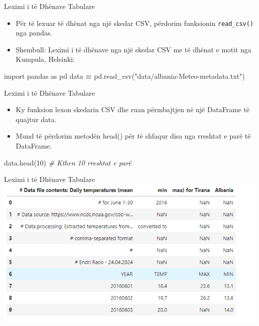 \documentclass[
  ignorenonframetext,
]{beamer}
\newenvironment{Shaded}{\begin{snugshade}}{\end{snugshade}}
\newcommand{\CommentTok}[1]{\textcolor[rgb]{0.56,0.35,0.01}{\textit{#1}}}
\newcommand{\DecValTok}[1]{\textcolor[rgb]{0.00,0.00,0.81}{#1}}
\newcommand{\ImportTok}[1]{#1}
\newcommand{\NormalTok}[1]{#1}
\newcommand{\OperatorTok}[1]{\textcolor[rgb]{0.81,0.36,0.00}{\textbf{#1}}}
\newcommand{\StringTok}[1]{\textcolor[rgb]{0.31,0.60,0.02}{#1}}
\begin{document}
\begin{frame}[fragile]{Leximi i të Dhënave Tabulare}
\protect\hypertarget{leximi-i-tuxeb-dhuxebnave-tabulare-1}{}
\begin{itemize}
\item
  Për të lexuar të dhënat nga një skedar CSV, përdorim funksionin
  \texttt{read\_csv()} nga pandas.
\item
  Shembull: Leximi i të dhënave nga një skedar CSV me të dhënat e motit
  nga Kumpula, Helsinki:
\end{itemize}

\begin{Shaded}
\begin{Highlighting}[]
  \ImportTok{import}\NormalTok{ pandas }\ImportTok{as}\NormalTok{ pd}
\NormalTok{  data }\OperatorTok{=}\NormalTok{ pd.read\_csv(}\StringTok{"data/albania{-}Meteo{-}metadata.txt"}\NormalTok{)}
\end{Highlighting}
\end{Shaded}
\end{frame}

\begin{frame}[fragile]{Leximi i të Dhënave Tabulare}
\protect\hypertarget{leximi-i-tuxeb-dhuxebnave-tabulare-2}{}
\begin{itemize}
\item
  Ky funksion lexon skedarin CSV dhe ruan përmbajtjen në një DataFrame
  të quajtur data.
\item
  Mund të përdorim metodën head() për të shfaqur disa nga rreshtat e
  parë të DataFrame.
\end{itemize}

\begin{Shaded}
\begin{Highlighting}[]
\NormalTok{data.head(}\DecValTok{10}\NormalTok{)  }\CommentTok{\# Kthen 10 rreshtat e parë}
\end{Highlighting}
\end{Shaded}
\end{frame}

\begin{frame}{Leximi i të Dhënave Tabulare}
\protect\hypertarget{leximi-i-tuxeb-dhuxebnave-tabulare-3}{}
\includegraphics{./Figs/panda3.png}
\end{frame}
\end{document}
